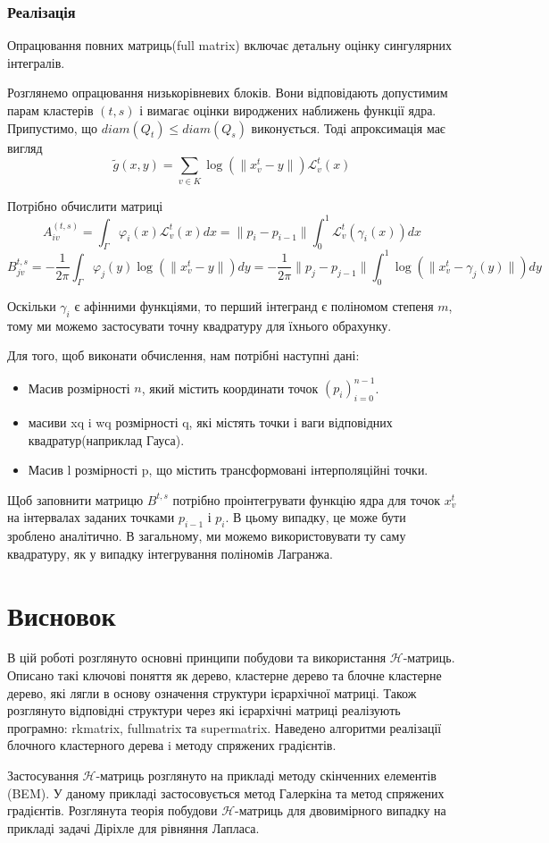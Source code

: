 \documentclass[12pt]{report}
\begin{document}
	\subsection{Реалізація}
	\hspace{0.8cm} Опрацювання повних матриць(full matrix) включає детальну оцінку сингулярних інтегралів.
	\par Розглянемо опрацювання низькорівневих блоків. Вони відповідають допустимим парам кластерів $(t,s)$ і вимагає оцінки вироджених наближень функції ядра. Припустимо, що $diam(Q_t)\le diam(Q_s)$ виконується. Тоді апроксимація має вигляд
	$$\tilde{g}(x,y)=\sum_{v\in K}\log(\|x_v^t-y\|)\mathcal{L}_v^t(x)$$
	\par Потрібно обчислити матриці
	$$A_{iv}^{(t,s)}=\int_{\Gamma}\varphi_i(x)\mathcal{L}_v^t(x)dx=\|p_i-p_{i-1}\|\int_{0}^{1}\mathcal{L}_v^t(\gamma_i(x))dx$$
	$$B_{jv}^{t,s}=-\frac{1}{2\pi}\int_{\Gamma}\varphi_j(y)\log(\|x_v^t-y\|)dy=-\frac{1}{2\pi}\|p_j-p_{j-1}\|\int_{0}^{1}\log(\|x_v^t-\gamma_j(y)\|)dy$$ 
	\par Оскільки $\gamma_i$ є афінними функціями, то перший інтегранд є поліномом степеня $m$, тому ми можемо застосувати точну квадратуру для їхнього обрахунку.
	\par Для того, щоб виконати обчислення, нам потрібні наступні дані:
	\begin{itemize}
		\item Масив розмірності $n$, який містить координати точок $(p_i)_{i=0}^{n-1}$.
		\item масиви xq i wq розмірності q, які містять точки і ваги відповідних квадратур(наприклад Гауса).
		\item Масив l розмірності p, що містить трансформовані інтерполяційні точки. 
	\end{itemize} 
	\par Щоб заповнити матрицю $B^{t,s}$ потрібно проінтегрувати функцію ядра для точок $x_v^t$ на інтервалах заданих точками $p_{i-1}$ і $p_i$. В цьому випадку, це може бути зроблено аналітично. В загальному, ми можемо використовувати ту саму квадратуру, як у випадку інтегрування поліномів Лагранжа.
	\chapter{Висновок}
	\hspace{0.8cm} В цій роботі розглянуто основні принципи побудови та використання $\mathcal{H}$-матриць. Описано такі ключові поняття як дерево, кластерне дерево та блочне кластерне дерево, які лягли в основу означення структури ієрархічної матриці. Також розглянуто відповідні структури через які ієрархічні матриці реалізують програмно: rkmatrix, fullmatrix та supermatrix. Наведено алгоритми реалізації блочного кластерного дерева i методу спряжених градієнтів.
	\par Застосування $\mathcal{H}$-матриць розглянуто на прикладі методу скінченних елементів (BEM). У даному прикладі застосовується метод Галеркіна та метод спряжених градієнтів. Розглянута теорія побудови $\mathcal{H}$-матриць для двовимірного випадку на прикладі задачі Діріхле для рівняння Лапласа.
\end{document}
